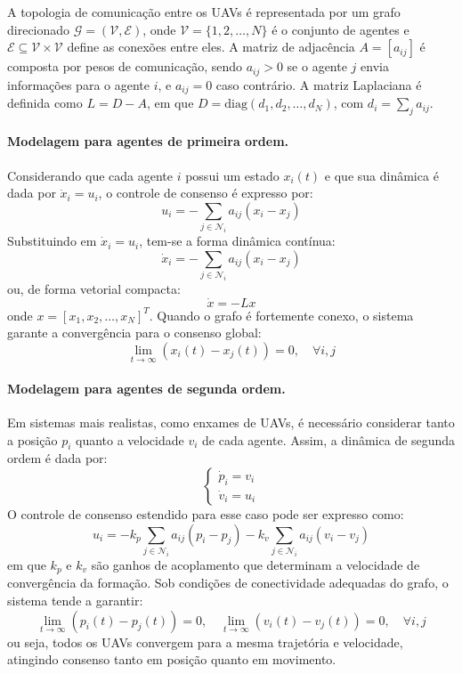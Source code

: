 \documentclass[portuguese]{sbcreviews-2025}%
\begin{document}
A topologia de comunicação entre os UAVs é representada por um grafo direcionado $\mathcal{G} = (\mathcal{V}, \mathcal{E})$, onde $\mathcal{V} = \{1, 2, \dots, N\}$ é o conjunto de agentes e $\mathcal{E} \subseteq \mathcal{V} \times \mathcal{V}$ define as conexões entre eles. A matriz de adjacência $A = [a_{ij}]$ é composta por pesos de comunicação, sendo $a_{ij} > 0$ se o agente $j$ envia informações para o agente $i$, e $a_{ij} = 0$ caso contrário. A matriz Laplaciana é definida como $L = D - A$, em que $D = \text{diag}(d_1, d_2, \dots, d_N)$, com $d_i = \sum_{j} a_{ij}$.

\paragraph{Modelagem para agentes de primeira ordem.}
Considerando que cada agente $i$ possui um estado $x_i(t)$ e que sua dinâmica é dada por $\dot{x}_i = u_i$, o controle de consenso é expresso por:
\[
u_i = -\sum_{j \in \mathcal{N}_i} a_{ij} (x_i - x_j)
\]
Substituindo em $\dot{x}_i = u_i$, tem-se a forma dinâmica contínua:
\[
\dot{x}_i = -\sum_{j \in \mathcal{N}_i} a_{ij} (x_i - x_j)
\]
ou, de forma vetorial compacta:
\[
\dot{x} = -Lx
\]
onde $x = [x_1, x_2, \dots, x_N]^T$. Quando o grafo é fortemente conexo, o sistema garante a convergência para o consenso global:
\[
\lim_{t \to \infty} (x_i(t) - x_j(t)) = 0, \quad \forall i,j
\]

\paragraph{Modelagem para agentes de segunda ordem.}
Em sistemas mais realistas, como enxames de UAVs, é necessário considerar tanto a posição $p_i$ quanto a velocidade $v_i$ de cada agente. Assim, a dinâmica de segunda ordem é dada por:
\[
\begin{cases}
\dot{p}_i = v_i \\
\dot{v}_i = u_i
\end{cases}
\]
O controle de consenso estendido para esse caso pode ser expresso como:
\[
u_i = -k_p \sum_{j \in \mathcal{N}_i} a_{ij}(p_i - p_j) - k_v \sum_{j \in \mathcal{N}_i} a_{ij}(v_i - v_j)
\]
em que $k_p$ e $k_v$ são ganhos de acoplamento que determinam a velocidade de convergência da formação. Sob condições de conectividade adequadas do grafo, o sistema tende a garantir:
\[
\lim_{t \to \infty} (p_i(t) - p_j(t)) = 0, \quad \lim_{t \to \infty} (v_i(t) - v_j(t)) = 0, \quad \forall i,j
\]
ou seja, todos os UAVs convergem para a mesma trajetória e velocidade, atingindo consenso tanto em posição quanto em movimento.
\end{document}
